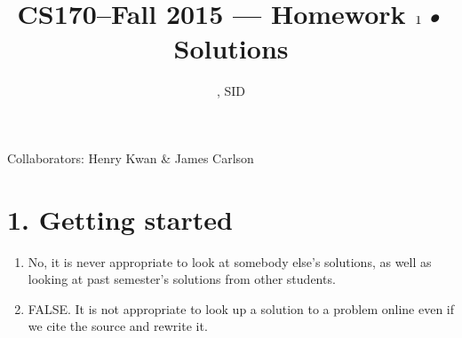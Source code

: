 \documentclass[11pt]{article}
\title{CS170--Fall 2015 --- Homework $1$\textsl{•} Solutions}
\author{\Name, SID \SID}
\date{}
\newenvironment{qparts}{\begin{enumerate}[{(}a{)}]}{\end{enumerate}}
\begin{document}
\maketitle

Collaborators: Henry Kwan \& James Carlson

\section*{1. Getting started}
\begin{qparts}
\item
No, it is never appropriate to look at somebody else's solutions, as well as looking at past semester's solutions from other students. 

\item
FALSE. It is not appropriate to look up a solution to a problem online even if we cite the source and rewrite it. 

\end{qparts}



\newpage
\end{document}
